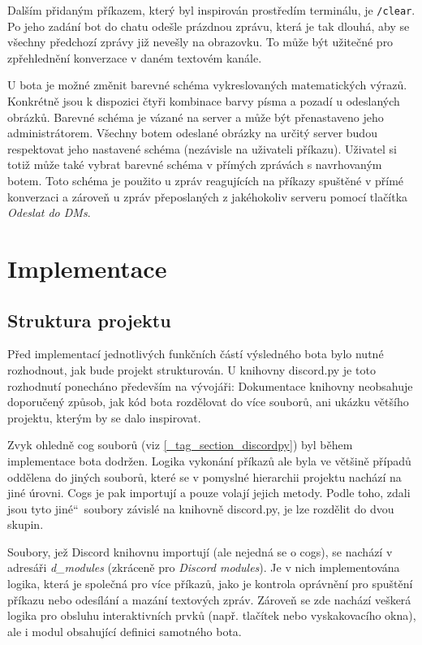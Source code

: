 \documentclass[FM]{tulthesis}
\begin{document}
	Dalším přidaným příkazem, který byl inspirován prostředím terminálu, je \verb*|/clear|. Po jeho zadání bot do chatu odešle  prázdnou zprávu, která je tak dlouhá, aby se všechny předchozí zprávy již nevešly na obrazovku. To může být užitečné pro zpřehlednění konverzace v daném textovém kanále.
	
	U bota je možné změnit barevné schéma vykreslovaných matematických výrazů. Konkrétně jsou k dispozici čtyři kombinace barvy písma a pozadí u odeslaných obrázků. Barevné schéma je vázané na server a může být přenastaveno jeho administrátorem. Všechny botem odeslané obrázky na určitý server budou respektovat jeho nastavené schéma (nezávisle na uživateli příkazu). Uživatel si totiž může také vybrat barevné schéma v přímých zprávách s navrhovaným botem. Toto schéma je použito u zpráv reagujících na příkazy spuštěné v přímé konverzaci a zároveň u zpráv přeposlaných z jakéhokoliv serveru pomocí tlačítka \textit{Odeslat do DMs}.
	
	\section{Implementace}
	
	\subsection{Struktura projektu}

	Před implementací jednotlivých funkčních částí výsledného bota bylo nutné rozhodnout, jak bude projekt strukturován. U knihovny discord.py je toto rozhodnutí ponecháno především na vývojáři: Dokumentace knihovny neobsahuje doporučený způsob, jak kód bota rozdělovat do více souborů, ani ukázku většího projektu, kterým by se dalo inspirovat.
	
	Zvyk ohledně cog souborů (viz \ref{_tag_section_discordpy}) byl během implementace bota dodržen. Logika vykonání příkazů ale byla ve většině případů oddělena do jiných souborů, které se v pomyslné hierarchii projektu nachází na jiné úrovni. Cogs je pak importují a pouze volají jejich metody. Podle toho, zdali jsou tyto \quotedblbase jiné\textquotedblleft\ soubory závislé na knihovně discord.py, je lze rozdělit do dvou skupin.
	
	Soubory, jež Discord knihovnu importují (ale nejedná se o cogs), se nachází v adresáři \textit{d\_modules} (zkráceně pro \textit{Discord modules}). Je v nich implementována logika, která je společná pro více příkazů, jako je kontrola oprávnění pro spuštění příkazu nebo odesílání a mazání textových zpráv. Zároveň se zde nachází veškerá logika pro obsluhu interaktivních prvků (např. tlačítek nebo vyskakovacího okna), ale i modul obsahující definici samotného bota.
	
\end{document}
